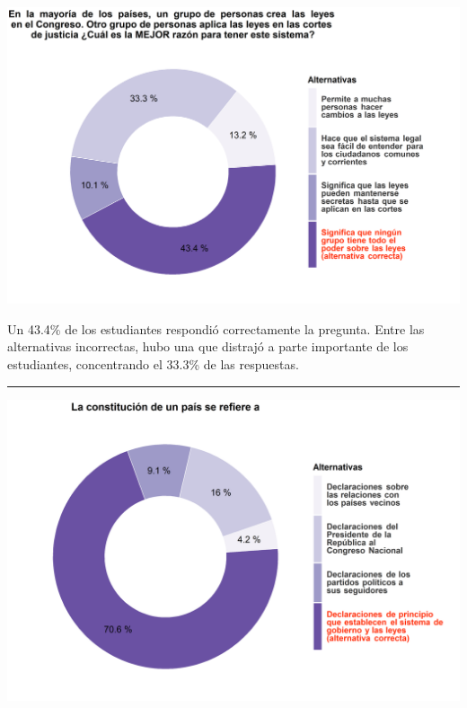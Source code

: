\documentclass[
  14pt,
]{book}
\let\origfigure\figure
\let\endorigfigure\endfigure
\renewenvironment{figure}[1][2] {
  \expandafter\origfigure\expandafter[H]
} {
  \endorigfigure
}
\begin{document}
\begin{figure}[!ht]

{\centering \includegraphics[width=0.8\linewidth,]{images/ccivico_1} 

}

\caption{Razones para crear leyes en el Congreso}\label{fig:unnamed-chunk-5}
\end{figure}

Un 43.4\% de los estudiantes respondió correctamente la pregunta. Entre las alternativas incorrectas, hubo una que distrajó a parte importante de los estudiantes, concentrando el 33.3\% de las respuestas.

\begin{center}\rule{0.5\linewidth}{0.5pt}\end{center}

\begin{figure}[!ht]

{\centering \includegraphics[width=0.8\linewidth,]{images/ccivico_2} 

}

\caption{Definiciones de constitución}\label{fig:unnamed-chunk-6}
\end{figure}
\end{document}

